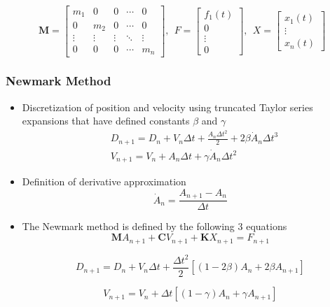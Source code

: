 \documentclass[xcolor=svgnames,9pt]{beamer}
\theoremstyle{remark}
\begin{document}
\begin{frame}
				\begin{equation*}
					\textbf{M}=
					\begin{bmatrix}
						m_1 & 0 & 0 & \cdots & 0\\
						0 & m_2 & 0 & \cdots & 0\\
						\vdots & \vdots & \vdots & \ddots & \vdots \\
						0 & 0 & 0 & \cdots & m_n
					\end{bmatrix},\ \ 
					F=
					\begin{bmatrix}
						f_1(t)\\
						0\\
						\vdots \\
						0
					\end{bmatrix},\ \
					X=
					\begin{bmatrix}
						x_1(t)\\
						\vdots \\
						x_n(t)
					\end{bmatrix}
				\end{equation*}
		\end{frame}
		\begin{frame}
  			\frametitle{Newmark Method}
			\begin{itemize}
				\item Discretization of position and velocity using truncated Taylor series expansions that have defined constants $\beta$ and $\gamma$
				\begin{align*}
					&D_{n+1} = D_{n}+V_{n}\Delta t+\frac{A_{{n}}{\Delta t}^{2}}{2}+2\beta \dot{A}_{n}{\Delta t}^3\\
					&V_{n+1} = V_{n}+A_{n}\Delta t+\gamma \dot{A}_{n} \Delta t^2
				\end{align*}
				\item Definition of derivative approximation
				\begin{equation*}
					\dot{A}_{n} = \frac {A_{{n+1}}-A_{{n}}}{\Delta t}
				\end{equation*}
				\item The Newmark method is defined by the following 3 equations
				\begin{equation}
					\textbf{M}A_{n+1}+\textbf{C}V_{n+1}+\textbf{K}X_{n+1} =F_{n+1}
				\end{equation}

				\begin{equation}
					D_{n+1} = D_{n}+V_{n}\Delta t+\frac{{\Delta t}^{2}}{2}[(1-2\beta)A_n + 2\beta A_{n+1}]
				\end{equation}

				\begin{equation}
					V_{n+1} = V_{n}+\Delta t[(1-\gamma)A_n + \gamma A_{n+1}]
				\end{equation}

			\end{itemize}
		\end{frame}
\end{document}
